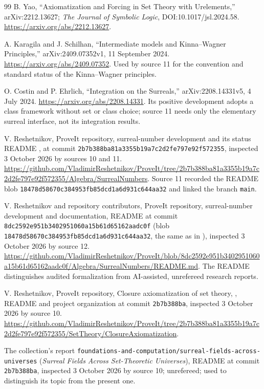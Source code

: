 \documentclass[11pt,letterpaper]{article}
\theoremstyle{definition}
\theoremstyle{remark}
\newcommand{\repo}[1]{\nolinkurl{#1}}
\begin{document}
\begin{thebibliography}{99}
B. Yao, ``Axiomatization and Forcing in Set Theory with Urelements,''
arXiv:2212.13627; \emph{The Journal of Symbolic Logic},
DOI:10.1017/jsl.2024.58. \url{https://arxiv.org/abs/2212.13627}.

A. Karagila and J. Schilhan, ``Intermediate models and Kinna--Wagner
Principles,'' arXiv:2409.07352v1, 11 September 2024.
\url{https://arxiv.org/abs/2409.07352}. Used by source 11 for the convention and
standard status of the Kinna--Wagner principles.

O. Costin and P. Ehrlich, ``Integration on the Surreals,'' arXiv:2208.14331v5,
4 July 2024. \url{https://arxiv.org/abs/2208.14331}. Its positive development
adopts a class framework without set or class choice; source 11 needs only the
elementary surreal interface, not its integration results.

V. Reshetnikov, ProveIt repository, surreal-number development and its status
README , at commit
\texttt{2b7b388ba81a3355b19a7c2d2fe797e92f572355}, inspected 3 October 2026 by
sources 10 and 11.
\url{https://github.com/VladimirReshetnikov/ProveIt/tree/2b7b388ba81a3355b19a7c2d2fe797e92f572355/Algebra/SurrealNumbers}.
Source 11 recorded the README blob \texttt{18478d58670c384953fb85dcd1a6d931c644aa32}
and linked the branch \texttt{main}.

V. Reshetnikov and repository contributors, ProveIt repository, surreal-number
development and documentation, README 
at commit \texttt{8dc2592e951b3402951060a15b61d65162aadc0f} (blob
\texttt{18478d58670c384953fb85dcd1a6d931c644aa32}, the same as in
\cite{ProveItSurreal}), inspected 3 October 2026 by source 12.
\url{https://github.com/VladimirReshetnikov/ProveIt/blob/8dc2592e951b3402951060a15b61d65162aadc0f/Algebra/SurrealNumbers/README.md}.
The README distinguishes audited formalization from AI-assisted, unrefereed
research reports.

V. Reshetnikov, ProveIt repository, Closure axiomatization of set theory,
, README and project organization at
commit \texttt{2b7b388ba}, inspected 3 October 2026 by source 10.
\url{https://github.com/VladimirReshetnikov/ProveIt/tree/2b7b388ba81a3355b19a7c2d2fe797e92f572355/SetTheory/ClosureAxiomatization}.

The collection's report \repo{foundations-and-computation/surreal-fields-across-universes}
(\emph{Surreal Fields Across Set-Theoretic Universes}), README at commit
\texttt{2b7b388ba}, inspected 3 October 2026 by source 10; unrefereed; used to
distinguish its topic from the present one.



\end{thebibliography}
\end{document}
